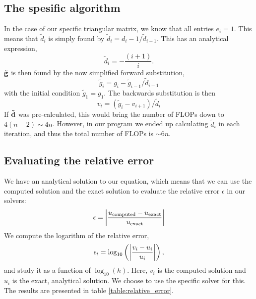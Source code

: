 \documentclass[english, nofootinbib]{revtex4-1}  %
\begin{document}
\subsection{The spesific algorithm}
In the case of our specific triangular matrix, we know that all entries $e_i = 1$. This means that $\tilde{d}_i$ is simply found by $\tilde{d}_i = d_i -1/\tilde{d}_{i-1}$. This has an analytical expression,
\begin{equation} \label{eq: d_i}
\tilde{d}_i = -\frac{(i+1)}{i}.
\end{equation}
$\bf{\tilde{g}}$ is then found by the now simplified forward substitution,
\begin{equation}
\tilde{g}_i = g_i - \tilde{g}_{i-1}/\tilde{d}_{i-1}
\end{equation}
with the initial condition $\tilde{g}_1 = g_1$.
The backwards substitution is then 
\begin{equation}
v_i = (\tilde{g}_i - v_{i+1})/\tilde{d}_i
\end{equation}
If $\bf{\tilde{d}}$ was pre-calculated, this would bring the number of FLOPs down to $4(n-2)\sim 4n$. However, in our program we ended up calculating $\tilde{d}_i$ in each iteration, and thus the total number of FLOPs is $\sim 6n$.
\subsection{Evaluating the relative error}
We have an analytical solution to our equation, which means that we can use the computed solution and the exact solution to evaluate the relative error $\epsilon$ in our solvers:
\begin{equation}
\epsilon = \abs{\frac{u_{\textrm{computed}}-u_{\textrm{exact}}}{u_{\textrm{exact}}}}
\end{equation}
We compute the logarithm of the relative error,
\begin{equation}
\epsilon_i = \log_{10}\left(\abs{\frac{v_i-u_i}{u_i}}\right),
\end{equation}
and study it as a function of $\log_{10}(h)$. Here, $v_i$ is the computed solution and $u_i$ is the exact, analytical solution. We choose to use the specific solver for this.
The results are presented in table \ref{table:relative_error}.
\end{document}
